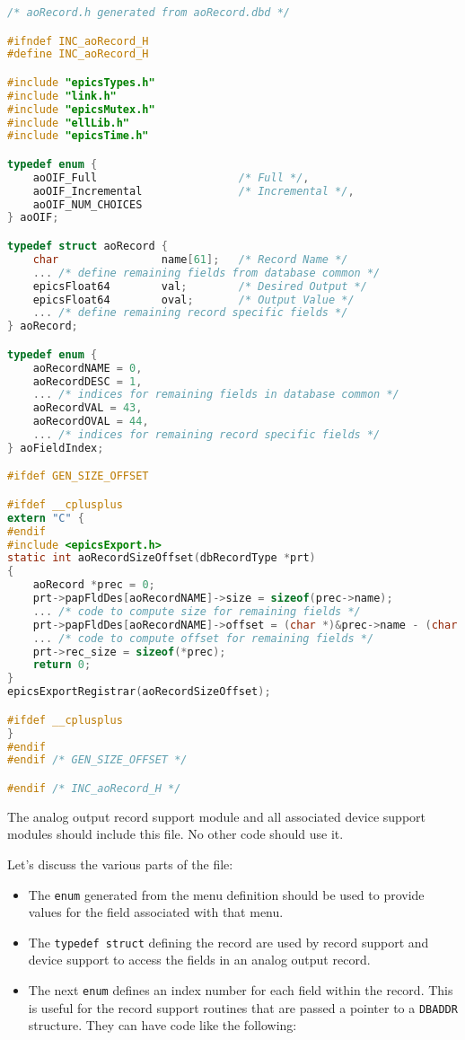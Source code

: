 \begin{lstlisting}[language=C]
/* aoRecord.h generated from aoRecord.dbd */

#ifndef INC_aoRecord_H
#define INC_aoRecord_H

#include "epicsTypes.h"
#include "link.h"
#include "epicsMutex.h"
#include "ellLib.h"
#include "epicsTime.h"

typedef enum {
    aoOIF_Full                      /* Full */,
    aoOIF_Incremental               /* Incremental */,
    aoOIF_NUM_CHOICES
} aoOIF;

typedef struct aoRecord {
    char                name[61];   /* Record Name */
    ... /* define remaining fields from database common */
    epicsFloat64        val;        /* Desired Output */
    epicsFloat64        oval;       /* Output Value */
    ... /* define remaining record specific fields */
} aoRecord;

typedef enum {
    aoRecordNAME = 0,
    aoRecordDESC = 1,
    ... /* indices for remaining fields in database common */
    aoRecordVAL = 43,
    aoRecordOVAL = 44,
    ... /* indices for remaining record specific fields */
} aoFieldIndex;

#ifdef GEN_SIZE_OFFSET

#ifdef __cplusplus
extern "C" {
#endif
#include <epicsExport.h>
static int aoRecordSizeOffset(dbRecordType *prt)
{
    aoRecord *prec = 0;
    prt->papFldDes[aoRecordNAME]->size = sizeof(prec->name);
    ... /* code to compute size for remaining fields */
    prt->papFldDes[aoRecordNAME]->offset = (char *)&prec->name - (char *)prec;
    ... /* code to compute offset for remaining fields */
    prt->rec_size = sizeof(*prec);
    return 0;
}
epicsExportRegistrar(aoRecordSizeOffset);

#ifdef __cplusplus
}
#endif
#endif /* GEN_SIZE_OFFSET */

#endif /* INC_aoRecord_H */
\end{lstlisting}

The analog output record support module and all associated device support modules should include this file.
No other code should use it.

Let's discuss the various parts of the file:

\begin{itemize}
\item The \verb|enum| generated from the menu definition should be used to provide values for the field associated with that menu.

\item The \verb|typedef struct| defining the record are used by record support and device support to access the fields in an analog output record.

\item The next \verb|enum| defines an index number for each field within the record.
This is useful for the record support routines that are passed a pointer to a \verb|DBADDR| structure.
They can have code like the following:

\end{itemize}

